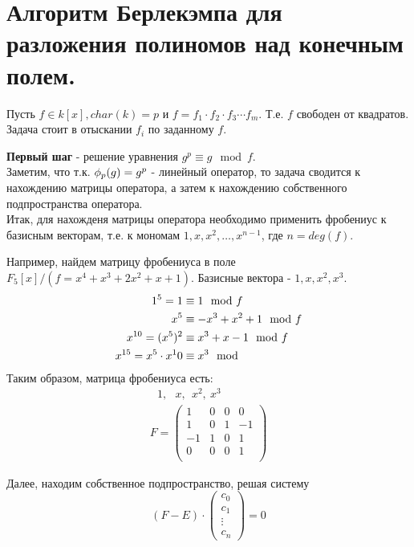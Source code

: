 \section{Алгоритм Берлекэмпа для разложения полиномов над конечным полем.}

Пусть $f \in k[x], char(k) = p$ и $f = f_1 \cdot f_2 \cdot f_3 \cdots f_m$. Т.е. $f$ свободен от квадратов. \\
Задача стоит в отыскании $f_i$ по заданному $f$.

\textbf{Первый шаг} - решение уравнения $g^p \equiv g \mod f$.\\
Заметим, что т.к. $\phi_{p}(g) = g^p$ - линейный оператор, то задача сводится к нахождению матрицы оператора, а затем к
нахождению собственного подпространства оператора. \\
Итак, для нахожденя матрицы оператора необходимо применить фробениус к базисным векторам, т.е. к мономам $1, x, x^2,
\dots, x^{n - 1}$, где $n = deg(f)$.

Например, найдем матрицу фробениуса в поле $F_5[x] / (f = x^4+x^3+2x^2+x+1)$. Базисные вектора - $1, x, x^2, x^3$.
\begin{align}
1^5 = 1 &\equiv 1 \mod f \notag \\
x^5 &\equiv -x^3 + x^2 + 1 \mod f \notag \\
x^{10} = (x^5)^2 &\equiv x^3 + x - 1 \mod f \notag \\
x^{15} = x^5 \cdot x^10 &\equiv x^3 \mod \notag 
\end{align}
Таким образом, матрица фробениуса есть:
\[
\begin{array}{l}
~~~1,~~~x,~~x^2,~x^3 \\
F = 
\begin{pmatrix}
1 & 0 & 0 & 0 \\
1 & 0 & 1 & -1 \\
-1 & 1 & 0 & 1 \\
0 & 0 & 0 & 1 \\ 
\end{pmatrix}
\end{array}
\]

Далее, находим собственное подпространство, решая систему 
\[(F - E) \cdot \begin{pmatrix} c_0 \\ c_1\\ \vdots \\ c_n \end{pmatrix} = 0\]


